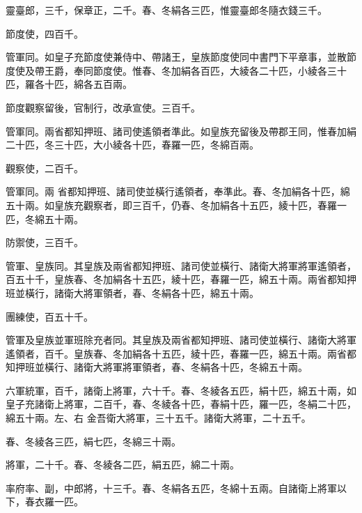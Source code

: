 \begin{pinyinscope}
 靈臺郎，三千，保章正，二千。春、冬絹各三匹，惟靈臺郎冬隨衣錢三千。



 節度使，四百千。



 管軍同。如皇子充節度使兼侍中、帶諸王，皇族節度使同中書門下平章事，並散節度使及帶王爵，奉同節度使。惟春、冬加絹各百匹，大綾各二十匹，小綾各三十匹，羅各十匹，綿各五百兩。



 節度觀察留後，官制行，改承宣使。三百千。



 管軍同。兩省都知押班、諸司使遙領者準此。如皇族充留後及帶郡王同，惟春加絹二十匹，冬三十匹，大小綾各十匹，春羅一匹，冬綿百兩。



 觀察使，二百千。



 管軍同。兩
 省都知押班、諸司使並橫行遙領者，奉準此。春、冬加絹各十匹，綿五十兩。如皇族充觀察者，即三百千，仍春、冬加絹各十五匹，綾十匹，春羅一匹，冬綿五十兩。



 防禦使，三百千。



 管軍、皇族同。其皇族及兩省都知押班、諸司使並橫行、諸衛大將軍將軍遙領者，百五十千，皇族春、冬加絹各十五匹，綾十匹，春羅一匹，綿五十兩。兩省都知押班並橫行，諸衛大將軍領者，春、冬絹各十匹，綿五十兩。



 團練使，百五十千。



 管軍及皇族並軍班除充者同。其皇族及兩省都知押班、諸司使並橫行、諸衛大將軍遙領者，百千。皇族春、冬加絹各十五匹，綾十匹，春羅一匹，綿五十兩。兩省都知押班並橫行、諸衛大將軍將軍領者，春、冬絹各十匹，冬綿五十兩。



 六軍統軍，百千，諸衛上將軍，六十千。春、冬綾各五匹，絹十匹，綿五十兩，如皇子充諸衛上將軍，二百千，春、冬綾各十匹，春絹十匹，羅一匹，冬絹二十匹，綿五十兩。左、右
 金吾衛大將軍，三十五千。諸衛大將軍，二十五千。



 春、冬綾各三匹，絹七匹，冬綿三十兩。



 將軍，二十千。春、冬綾各二匹，絹五匹，綿二十兩。



 率府率、副，中郎將，十三千。春、冬絹各五匹，冬綿十五兩。自諸衛上將軍以下，春衣羅一匹。




\end{pinyinscope}

